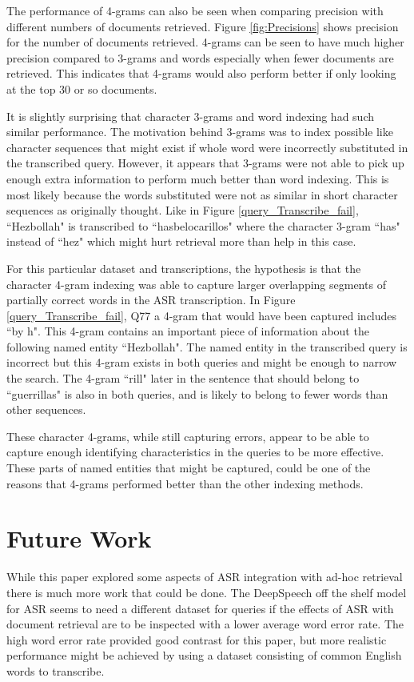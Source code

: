 \documentclass[jair, twoside,11pt,theapa]{article}
\begin{document}
The performance of 4-grams can also be seen when comparing precision with different numbers of documents retrieved. Figure \ref{fig:Precisions} shows precision for the number of documents retrieved. 4-grams can be seen to have much higher precision compared to 3-grams and words especially when fewer documents are retrieved. This indicates that 4-grams would also perform better if only looking at the top 30 or so documents. 

It is slightly surprising that character 3-grams and word indexing had such similar performance. The motivation behind 3-grams was to index possible like character sequences that might exist if whole word were incorrectly substituted in the transcribed query. However, it appears that 3-grams were not able to pick up enough extra information to perform much better than word indexing. This is most likely because the words substituted were not as similar in short character sequences as originally thought. Like in Figure \ref{query_Transcribe_fail}, ``Hezbollah" is transcribed to ``hasbelocarillos" where the character 3-gram ``has" instead of ``hez" which might hurt retrieval more than help in this case. 

For this particular dataset and transcriptions, the hypothesis is that the character 4-gram indexing was able to capture larger overlapping segments of partially correct words in the ASR transcription. In Figure \ref{query_Transcribe_fail}, Q77 a 4-gram that would have been captured includes ``by h". This 4-gram contains an important piece of information about the following named entity ``Hezbollah". The named entity in the transcribed query is incorrect but this 4-gram exists in both queries and might be enough to narrow the search. The 4-gram ``rill" later in the sentence that should belong to ``guerrillas" is also in both queries, and is likely to belong to fewer words than other sequences. 

These character 4-grams, while still capturing errors, appear to be able to capture enough identifying characteristics in the queries to be more effective. These parts of named entities that might be captured, could be one of the reasons that 4-grams performed better than the other indexing methods. 


\section{Future Work}
\label{Future}
While this paper explored some aspects of ASR integration with ad-hoc retrieval there is much more work that could be done. The DeepSpeech off the shelf model for ASR seems to need a different dataset for queries if the effects of ASR with document retrieval are to be inspected with a lower average word error rate. The high word error rate provided good contrast for this paper, but more realistic performance might be achieved by using a dataset consisting of common English words to transcribe. 
\end{document}
